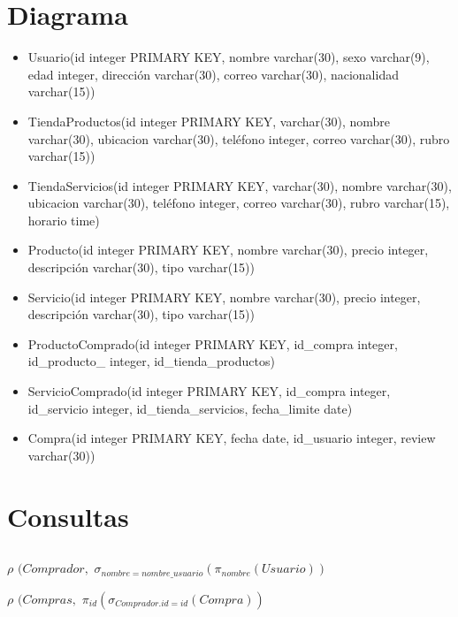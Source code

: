 \documentclass{article}
\begin{document}
 \section{Diagrama}
 \begin{itemize}
\item Usuario(id integer PRIMARY KEY, nombre varchar(30), sexo varchar(9), edad integer, dirección varchar(30), correo varchar(30), nacionalidad varchar(15))

\item TiendaProductos(id integer PRIMARY KEY, varchar(30), nombre varchar(30), ubicacion varchar(30), teléfono integer, correo varchar(30), rubro varchar(15)) 

\item TiendaServicios(id integer PRIMARY KEY, varchar(30), nombre varchar(30), ubicacion varchar(30), teléfono integer, correo varchar(30), rubro varchar(15), horario time)

\item Producto(id integer PRIMARY KEY, nombre varchar(30), precio integer, descripción varchar(30), tipo varchar(15))

\item Servicio(id integer PRIMARY KEY, nombre varchar(30), precio integer, descripción varchar(30), tipo varchar(15))

\item ProductoComprado(id integer PRIMARY KEY, id\_compra integer, id\_producto\_ integer, id\_tienda\_productos)

\item ServicioComprado(id integer PRIMARY KEY, id\_compra integer, id\_servicio integer, id\_tienda\_servicios, fecha\_limite date)

\item Compra(id integer PRIMARY KEY, fecha date, id\_usuario integer, review varchar(30))
\end{itemize}
 \section{Consultas}
 
	\subsection{}
$\rho$ $(Comprador,$ $\sigma_{nombre = nombre\_usuario}(\pi_{nombre}(Usuario))$


$\rho$ $(Compras,$ $\pi_{id}(\sigma_{Comprador.id = id}(Compra))$
\end{document}
